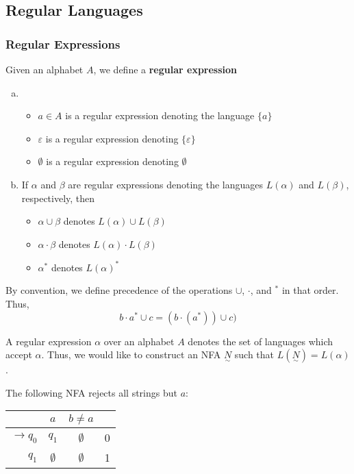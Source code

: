 \subsection{Regular Languages}\label{subsec:regular-languages}

\subsubsection{Regular Expressions}
\begin{definition}
Given an alphabet \(A\), we define a \textbf{regular expression}
\begin{enumerate}[(a)]
    \item \begin{itemize}
        \item \(a\in A\) is a regular expression denoting the language \(\{a\}\)
        \item \(\varepsilon\) is a regular expression denoting \(\{\varepsilon\}\)
        \item \(\emptyset\) is a regular expression denoting \(\emptyset\)
    \end{itemize}
    
    \item If \(\alpha\) and \(\beta\) are regular expressions denoting the languages \(L(\alpha)\) and \(L(\beta)\), respectively, then 
    \begin{itemize}
        \item \(\alpha\cup\beta\) denotes \(L(\alpha)\cup L(\beta)\)
        \item \(\alpha\cdot\beta\) denotes \(L(\alpha)\cdot L(\beta)\)
        \item \(\alpha^*\) denotes \(L(\alpha)^*\)
    \end{itemize}
\end{enumerate}
\end{definition}

By convention, we define precedence of the operations \(\cup\), \(\cdot\), and \(^*\) in that order. Thus, \[b\cdot a^*\cup c=(b\cdot(a^*))\cup c)\]

A regular expression \(\alpha\) over an alphabet \(A\) denotes the set of languages which accept \(\alpha\). Thus, we would like to construct an NFA \(\underset{\sim}{N}\) such that \(L(\underset{\sim}{N})=L(\alpha)\).

The following NFA rejects all strings but \(a\):

\begin{center}\begin{tabular}{r| c c r}
      & \(a\) & \(b\neq a\) & \\\bottomrule
      \(\to q_0\) & \(q_1\) & \(\emptyset\) & 0\\
            \(q_1\) & \(\emptyset\) & \(\emptyset\) & 1\\
 \end{tabular}\end{center}

